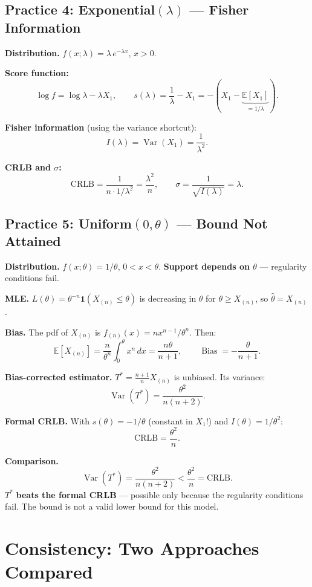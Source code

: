\documentclass[11pt,a4paper]{article}
\newcommand{\E}{\mathbb{E}}
\newcommand{\Var}{\operatorname{Var}}
\newcommand{\Bias}{\operatorname{Bias}}
\begin{document}
\subsection*{Practice 4: Exponential$(\lambda)$ --- Fisher Information}

\textbf{Distribution.} $f(x;\lambda) = \lambda\,e^{-\lambda x}$, $x>0$.

\textbf{Score function:}
\[
  \log f = \log\lambda - \lambda X_1, \qquad
  s(\lambda) = \frac{1}{\lambda} - X_1 = -(X_1 - \underbrace{\E[X_1]}_{=1/\lambda}).
\]

\textbf{Fisher information} (using the variance shortcut):
\[
  I(\lambda) = \Var(X_1) = \frac{1}{\lambda^2}.
\]

\textbf{CRLB and $\sigma$:}
\[
  \text{CRLB} = \frac{1}{n\cdot 1/\lambda^2} = \frac{\lambda^2}{n}, \qquad
  \sigma = \frac{1}{\sqrt{I(\lambda)}} = \lambda.
\]

\subsection*{Practice 5: Uniform$(0,\theta)$ — Bound Not Attained}

\textbf{Distribution.} $f(x;\theta)=1/\theta$, $0<x<\theta$. \textbf{Support depends on $\theta$} — regularity conditions fail.

\textbf{MLE.} $L(\theta) = \theta^{-n}\mathbf{1}(X_{(n)}\leq\theta)$ is decreasing in $\theta$ for $\theta\geq X_{(n)}$, so $\hat\theta = X_{(n)}$.

\textbf{Bias.} The pdf of $X_{(n)}$ is $f_{(n)}(x)=nx^{n-1}/\theta^n$. Then:
\[
  \E[X_{(n)}] = \frac{n}{\theta^n}\int_0^\theta x^n\,dx = \frac{n\theta}{n+1},
  \qquad \Bias = -\frac{\theta}{n+1}.
\]

\textbf{Bias-corrected estimator.} $T^* = \frac{n+1}{n}X_{(n)}$ is unbiased. Its variance:
\[
  \Var(T^*) = \frac{\theta^2}{n(n+2)}.
\]

\textbf{Formal CRLB.} With $s(\theta)=-1/\theta$ (constant in $X_1$!) and $I(\theta)=1/\theta^2$:
\[
  \text{CRLB} = \frac{\theta^2}{n}.
\]

\textbf{Comparison.}
\[
  \Var(T^*) = \frac{\theta^2}{n(n+2)} < \frac{\theta^2}{n} = \text{CRLB}.
\]
$T^*$ \textbf{beats the formal CRLB} — possible only because the regularity conditions fail. The bound is not a valid lower bound for this model.

\newpage
\section{Consistency: Two Approaches Compared}
\end{document}
